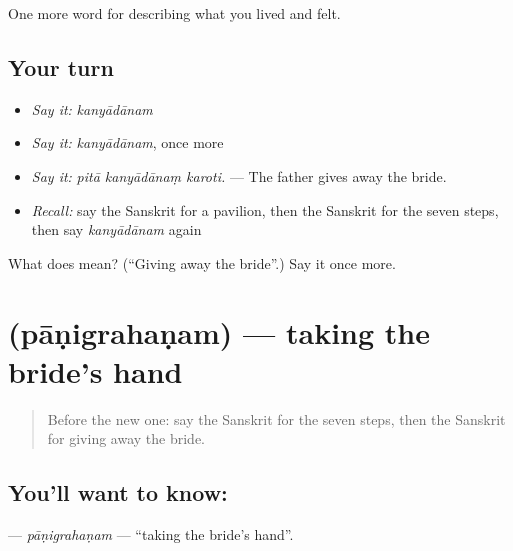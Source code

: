 \begin{grammarlens}[title={What you've built}]
One more word for describing what you lived and felt.
\end{grammarlens}

\subsection*{Your turn}
\begin{itemize}
\raggedright
  \item \emph{Say it:} \emph{kanyādānam}
  \item \emph{Say it:} \emph{kanyādānam}, once more
  \item \emph{Say it:} \emph{pitā kanyādānaṃ karoti.} — The father gives away the bride.
  \item \emph{Recall:} say the Sanskrit for a pavilion, then the Sanskrit for the seven steps, then say \emph{kanyādānam} again
\end{itemize}

\begin{tcolorbox}[breakable,colback=teal!4,colframe=teal!35!black,title={Before you move on}]
What does  mean? (\textquotedblleft{}Giving away the bride\textquotedblright{}.) Say it once more.
\end{tcolorbox}
\section[\texorpdfstring{\sk{पाणिग्रहणम्} (pāṇigrahaṇam)}{पाणिग्रहणम् (pāṇigrahaṇam)}]{ (pāṇigrahaṇam) — taking the bride's hand}

\label{lesson:SA-C497-panigrahanam}



\begin{quote}
Before the new one: say the Sanskrit for the seven steps, then the Sanskrit for giving away the bride.
\end{quote}

\subsection*{You'll want to know: }
\textbf{} — \emph{pāṇigrahaṇam} — \textquotedblleft{}taking the bride's hand\textquotedblright{}.

\begin{quote}
   
\end{quote}


